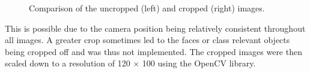 \begin{figure}[H]
    \centering
    \begin{subfigure}{0.48\textwidth}
        \centering
    \end{subfigure}
    \hfill
    \begin{subfigure}{0.48\textwidth}
        \centering
    \end{subfigure}
    \caption{Comparison of the uncropped (left) and cropped (right) images.}
    \label{fig:comp1}
\end{figure}
\noindent
This is possible due to the camera position being relatively consistent throughout all images. A greater crop sometimes led to the faces or class relevant objects being cropped off and was thus not implemented. 
The cropped images were then scaled down to a resolution of 120 $\times$ 100 using the OpenCV \cite{opencv} library.
